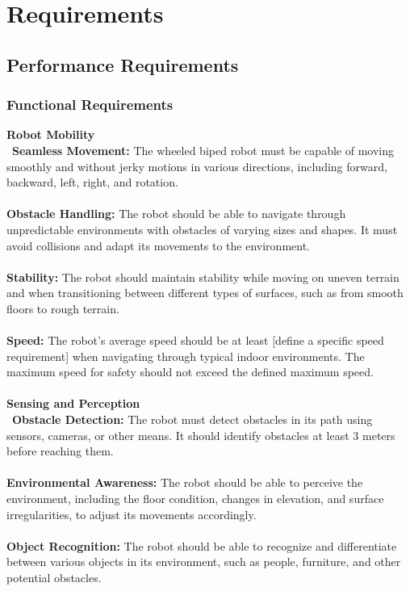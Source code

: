 \documentclass[12pt]{article}
\begin{document}
\section{Requirements}



\subsection{Performance Requirements}
\subsubsection{Functional Requirements}
\textbf{Robot Mobility}\\\
\noindent\textbf{Seamless Movement:} The wheeled biped robot must be capable of moving smoothly and without jerky motions in various directions, including forward, backward, left, right, and rotation.\\\\
\noindent\textbf{Obstacle Handling:} The robot should be able to navigate through unpredictable environments with obstacles of varying sizes and shapes. It must avoid collisions and adapt its movements to the environment.\\\\
\noindent\textbf{Stability:} The robot should maintain stability while moving on uneven terrain and when transitioning between different types of surfaces, such as from smooth floors to rough terrain.\\\\
\noindent\textbf{Speed:} The robot's average speed should be at least [define a specific speed requirement] when navigating through typical indoor environments. The maximum speed for safety should not exceed the defined maximum speed.\\\\
\textbf{Sensing and Perception}\\\
\noindent\textbf{Obstacle Detection:} The robot must detect obstacles in its path using sensors, cameras, or other means. It should identify obstacles at least 3 meters before reaching them.\\\\
\noindent\textbf{Environmental Awareness:}  The robot should be able to perceive the environment, including the floor condition, changes in elevation, and surface irregularities, to adjust its movements accordingly.\\\\
\noindent\textbf{Object Recognition:} The robot should be able to recognize and differentiate between various objects in its environment, such as people, furniture, and other potential obstacles.\\\\
\end{document}
